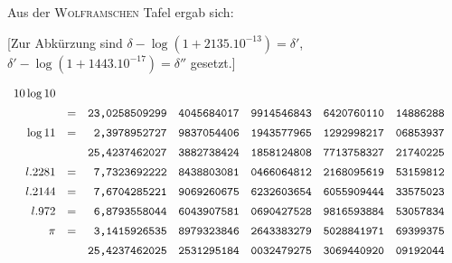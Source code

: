 
Aus der \textsc{Wolframschen} Tafel ergab sich:

[Zur Abkürzung sind $\delta-\log(1+2135.10^{-13})=\delta'$,
\hfill\break{} $\delta'-\log(1+1443.10^{-17})=\delta''$ gesetzt.]

\begingroup\footnotesize\setlength{\arraycolsep}{1pt}\renewcommand{\arraystretch}{1.12}\[
\begin{array}{rcrlllll}
10\log10&&&&&&&\\[5pt]
&=&\text{\ttfamily 23,0258509299}&\text{\ttfamily 4045684017}&\text{\ttfamily 9914546843}&\text{\ttfamily 6420760110}&\text{\ttfamily 14886288}&\\[5pt]
\log11&=&\text{\ttfamily 2,3978952727}&\text{\ttfamily 9837054406}&\text{\ttfamily 1943577965}&\text{\ttfamily 1292998217}&\text{\ttfamily 06853937}&\\[5pt]
&&\text{\ttfamily 25,4237462027}&\text{\ttfamily 3882738424}&\text{\ttfamily 1858124808}&\text{\ttfamily 7713758327}&\text{\ttfamily 21740225}&\\[5pt]
l.2281&=&\text{\ttfamily 7,7323692222}&\text{\ttfamily 8438803081}&\text{\ttfamily 0466064812}&\text{\ttfamily 2168095619}&\text{\ttfamily 53159812}&\\[5pt]
l.2144&=&\text{\ttfamily 7,6704285221}&\text{\ttfamily 9069260675}&\text{\ttfamily 6232603654}&\text{\ttfamily 6055909444}&\text{\ttfamily 33575023}&\\[5pt]
l.972&=&\text{\ttfamily 6,8793558044}&\text{\ttfamily 6043907581}&\text{\ttfamily 0690427528}&\text{\ttfamily 9816593884}&\text{\ttfamily 53057834}&\\[5pt]
\pi&=&\text{\ttfamily 3,1415926535}&\text{\ttfamily 8979323846}&\text{\ttfamily 2643383279}&\text{\ttfamily 5028841971}&\text{\ttfamily 69399375}&\\[5pt]
&&\text{\ttfamily 25,4237462025}&\text{\ttfamily 2531295184}&\text{\ttfamily 0032479275}&\text{\ttfamily 3069440920}&\text{\ttfamily 09192044}&\\[5pt]

\end{array}\]
